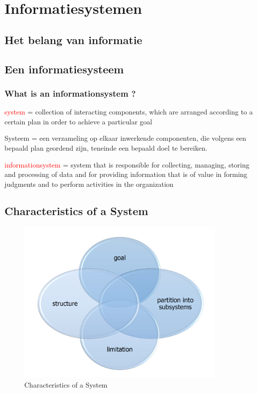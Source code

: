 \section{Informatiesystemen}

\subsection{Het belang van informatie}

\bi
\itf 
\itf 
\itf 
\itf 
\itf 
\itf 
\itf 
\itf 
\itf 
\itf 
\itf 
\itf 
\itf 
\itf 
\itf 
\itf 
\itf 
\itf 
\itf 
\itf 
\itf 
\itf 
\itf 
\itf 
\ei


\subsection{Een informatiesysteem}

\subsubsection{What is an \Gls{informationsystem} ?}

\textcolor{red}{\Gls{system}} = collection of interacting components, which are arranged according to a certain plan in order to achieve a particular goal

Systeem = een verzameling op elkaar inwerkende componenten, die volgens een bepaald plan geordend zijn, teneinde een bepaald doel te bereiken.

\textcolor{red}{\Gls{informationsystem}} = system that is responsible for collecting, managing, storing and processing of data and for providing information that is of value in forming judgments and to perform activities in the organization


\subsection{Characteristics of a System}

\begin{figure}[htp]
    \centering
            \includegraphics[width=4in]{img/osa1.PNG}
        \caption{Characteristics of a System}
    \label{fig:Characteristics of a System}
\end{figure}

